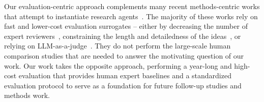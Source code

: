 Our evaluation-centric approach complements many recent methods-centric works that attempt to instantiate research agents~\cite{Wang2023SciMONSI,Baek2024ResearchAgentIR,Yang2023LargeLM,AIScientist,Li2024MLRCopilotAM}. 
The majority of these works rely on fast and lower-cost evaluation surrogates -- either by decreasing the number of expert reviewers~\cite{Baek2024ResearchAgentIR,Li2024MLRCopilotAM,Wang2023SciMONSI,Yang2023LargeLM}, constraining the length and detailedness of the ideas~\cite{Wang2023SciMONSI,Yang2023LargeLM}, or relying on LLM-as-a-judge~\cite{AIScientist}. 
They do not perform the large-scale human comparison studies that are needed to answer the motivating question of our work. Our work takes the opposite approach, performing a year-long and high-cost evaluation that provides human expert baselines and a standardized evaluation protocol to serve as a foundation for future follow-up studies and methods work.




